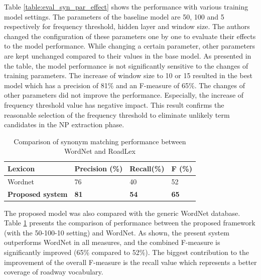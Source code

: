 \documentclass[Journal, BackFigs,NoLists, DoubleSpace]{ascelike}%
\begin{document}
%
Table \ref{table:eval_syn_par_effect} shows the performance with various training model settings. The parameters of the baseline model are 50, 100 and 5 respectively for frequency threshold, hidden layer and window size. The authors changed the configuration of these parameters one by one to evaluate their effects to the model performance. While changing a certain parameter, other parameters are kept unchanged compared to their values in the base model. As presented in the table, the model performance is not significantly sensitive to the changes of training parameters. The increase of window size to 10 or 15 resulted in the best model which has a precision of 81\% and an F-measure of 65\%. The changes of other parameters did not improve the performance. Especially, the increase of frequency threshold value has negative impact. This result confirms the reasonable selection of the frequency threshold to eliminate unlikely term candidates in the NP extraction phase.
%
\begin{table} [b] 
	\caption{Comparison of synonym matching performance between WordNet and RoadLex}
	\label{table:eval_syn_vs_Wordnet}
	\centering
	\small
	\renewcommand{\arraystretch}{1.25}
	\begin{tabular}{l l l l }
		\hline
		\hline
		\textbf{Lexicon} & \textbf{Precision (\%)}  & \textbf{Recall(\%)} & \textbf{F (\%)}\\
		\hline
		Wordnet	&76 	&40 	&52\\	
		\textbf{Proposed system} &\textbf{81}	&\textbf{54}		&\textbf{65}\\	
		\hline
		\hline
	\end{tabular}
	\normalsize
\end{table}
\par
The proposed model was also compared with the generic WordNet database. Table \ref{table:eval_syn_vs_Wordnet} presents the comparison of performance between the proposed framework (with the 50-100-10 setting) and WordNet. As shown, the present system outperforms WordNet in all measures, and the combined F-measure is significantly improved (65\% compared to 52\%). The biggest contribution to the improvement of the overall F-measure is the recall value which represents a better coverage of roadway vocabulary. 
\end{document}
